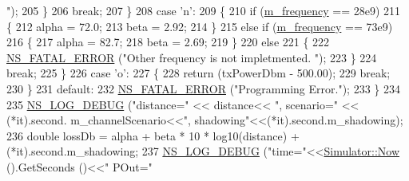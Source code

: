 \begin{DoxyCode}
{      "});
205                                 \}
206                                 \textcolor{keywordflow}{break};
207                         \}
208                         \textcolor{keywordflow}{case} \textcolor{charliteral}{'n'}:
209                         \{
210                                 \textcolor{keywordflow}{if} (\hyperlink{classMmWavePropagationLossModel_ab13f20e31b1a3f9dddcf3cad2f75b2d9}{m\_frequency} == 28e9)
211                                 \{
212                                         alpha = 72.0;
213                                         beta = 2.92;
214                                 \}
215                                 \textcolor{keywordflow}{else} \textcolor{keywordflow}{if} (\hyperlink{classMmWavePropagationLossModel_ab13f20e31b1a3f9dddcf3cad2f75b2d9}{m\_frequency} == 73e9)
216                                 \{
217                                         alpha = 82.7;
218                                         beta = 2.69;
219                                 \}
220                                 \textcolor{keywordflow}{else}
221                                 \{
222                                         \hyperlink{group__fatal_ga5131d5e3f75d7d4cbfd706ac456fdc85}{NS\_FATAL\_ERROR} (\textcolor{stringliteral}{"Other frequency is not impletmented.
      "});
223                                 \}
224                                 \textcolor{keywordflow}{break};
225                         \}
226                         \textcolor{keywordflow}{case} \textcolor{charliteral}{'o'}:
227                         \{
228                                 \textcolor{keywordflow}{return} (txPowerDbm - 500.00);
229                                 \textcolor{keywordflow}{break};
230                         \}
231                         \textcolor{keywordflow}{default}:
232                                 \hyperlink{group__fatal_ga5131d5e3f75d7d4cbfd706ac456fdc85}{NS\_FATAL\_ERROR} (\textcolor{stringliteral}{"Programming Error."});
233                 \}
234 
235                 \hyperlink{group__logging_ga413f1886406d49f59a6a0a89b77b4d0a}{NS\_LOG\_DEBUG} (\textcolor{stringliteral}{"distance="} << distance<< \textcolor{stringliteral}{", scenario="} << (*it).second.
      m\_channelScenario<<\textcolor{stringliteral}{", shadowing"}<<(*it).second.m\_shadowing);
236                 \textcolor{keywordtype}{double} lossDb = alpha + beta * 10 * log10(distance) + (*it).second.m\_shadowing;
237                 \hyperlink{group__logging_ga413f1886406d49f59a6a0a89b77b4d0a}{NS\_LOG\_DEBUG} (\textcolor{stringliteral}{"time="}<<\hyperlink{group__simulator_gac3635e2e87f7ce316c89290ee1b01d0d}{Simulator::Now} ().GetSeconds ()<<\textcolor{stringliteral}{" POut="}

\end{DoxyCode}
